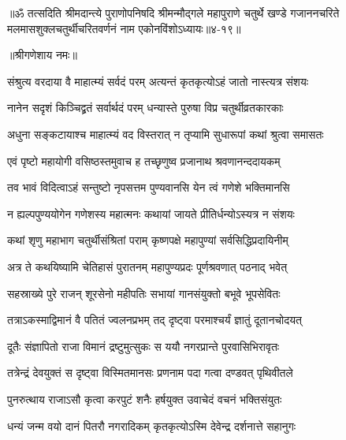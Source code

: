 ॥ॐ तत्सदिति श्रीमदान्त्ये पुराणोपनिषदि श्रीमन्मौद्गले महापुराणे चतुर्थे खण्डे गजाननचरिते मलमासशुक्लचतुर्थीचरितवर्णनं नाम एकोनविंशोऽध्यायः॥४-१९॥


\label{sec:magha-krishna-chaturthi-mahatmya-varnanam}

\centerline{॥श्रीगणेशाय नमः॥}


\twolineshloka
{संश्रुत्य वरदाया वै माहात्म्यं सर्वदं परम्}
{अत्यन्तं कृतकृत्योऽहं जातो नास्त्यत्र संशयः} %

\twolineshloka
{नानेन सदृशं किञ्चिद्व्रतं सर्वार्थदं परम्}
{धन्यास्ते पुरुषा विप्र चतुर्थीव्रतकारकाः} %

\twolineshloka
{अधुना सङ्कटायाश्च माहात्म्यं वद विस्तरात्}
{न तृप्यामि सुधारूपां कथां श्रुत्वा समासतः} %


\twolineshloka
{एवं पृष्टो महायोगी वसिष्ठस्तमुवाच ह}
{तच्छृणुष्व प्रजानाथ श्रवणानन्ददायकम्} %


\twolineshloka
{तव भावं विदित्वाऽहं सन्तुष्टो नृपसत्तम}
{पुण्यवानसि येन त्वं गणेशे भक्तिमानसि} %

\twolineshloka
{न ह्यल्पपुण्ययोगेन गणेशस्य महात्मनः}
{कथायां जायते प्रीतिर्धन्योऽस्यत्र न संशयः} %

\twolineshloka
{कथां श‍ृणु महाभाग चतुर्थीसंश्रितां पराम्}
{कृष्णपक्षे महापुण्यां सर्वसिद्धिप्रदायिनीम्} %

\twolineshloka
{अत्र ते कथयिष्यामि चेतिहासं पुरातनम्}
{महापुण्यप्रदः पूर्णश्रवणात् पठनाद् भवेत्} %

\twolineshloka
{सहस्राख्ये पुरे राजन् शूरसेनो महीपतिः}
{सभायां गानसंयुक्तो बभूवे भूपसेवितः} %

\twolineshloka
{तत्राऽकस्माद्विमानं वै पतितं ज्वलनप्रभम्}
{तद् दृष्ट्वा परमाश्चर्यं ज्ञातुं दूतानचोदयत्} %

\twolineshloka
{दूतैः संज्ञापितो राजा विमानं द्रष्टुमुत्सुकः}
{स ययौ नगरप्रान्ते पुरवासिभिरावृतः} %

\twolineshloka
{तत्रेन्द्रं देवयुक्तं स दृष्ट्वा विस्मितमानसः}
{प्रणनाम पदा गत्वा दण्डवत् पृथिवीतले} %

\twolineshloka
{पुनरुत्थाय राजाऽसौ कृत्वा करपुटं शनैः}
{हर्षयुक्त उवाचेदं वचनं भक्तिसंयुतः} %


\twolineshloka
{धन्यं जन्म वयो दानं पितरौ नगरादिकम्}
{कृतकृत्योऽस्मि देवेन्द्र दर्शनात्ते सहानुगः} %

